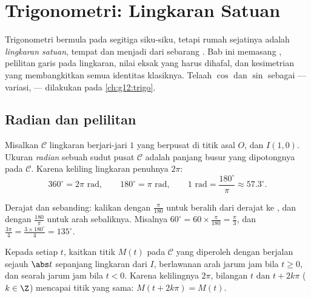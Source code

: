 \chapter{Trigonometri: Lingkaran Satuan}\label{ch:g11:trigo}

Trigonometri bermula pada segitiga siku-siku, tetapi rumah sejatinya adalah
\emph{lingkaran satuan}, tempat  dan  menjadi  dari sebarang
. Bab ini memasang , pelilitan garis
 pada lingkaran, nilai eksak yang harus dihafal, dan
kesimetrian yang membangkitkan semua identitas klasiknya. Telaah
$\cos$ dan $\sin$ sebagai  --- variasi,  --- dilakukan
pada \cref{ch:g12:trigo}.

\section{Radian dan pelilitan}

\begin{definition}[Radian]\label{def:g11:trigo:radian}
Misalkan $\mathcal C$ lingkaran berjari-jari $1$ yang berpusat di titik asal
$O$, dan $I(1, 0)$. Ukuran \emph{radian} sebuah sudut pusat
$\mathcal C$ adalah panjang busur yang dipotongnya pada $\mathcal C$.
Karena keliling lingkaran penuhnya $2\pi$:
\[
360^\circ = 2\pi \text{ rad},
\qquad
180^\circ = \pi \text{ rad},
\qquad
1 \text{ rad} = \frac{180^\circ}{\pi} \approx 57.3^\circ .
\]
\end{definition}

\begin{method}[Mengonversi]\label{met:g11:trigo:convert}
Derajat dan  sebanding: kalikan dengan $\frac{\pi}{180}$ untuk beralih
dari derajat ke , dan dengan $\frac{180}{\pi}$ untuk arah sebaliknya.
Misalnya $60^\circ = 60 \times \frac{\pi}{180} = \frac{\pi}{3}$, dan
$\frac{3\pi}{4} = \frac{3 \times 180^\circ}{4} = 135^\circ$.
\end{method}

\begin{definition}\label{def:g11:trigo:winding}
Kepada setiap  $t$, kaitkan titik $M(t)$ pada $\mathcal C$
yang diperoleh dengan berjalan sejauh $\abs t$ sepanjang lingkaran dari $I$,
berlawanan arah jarum jam bila $t \geq 0$, dan searah jarum jam bila $t < 0$. Karena
kelilingnya $2\pi$, bilangan $t$ dan $t + 2k\pi$ ($k \in \Z$)
mencapai titik yang sama: $M(t + 2k\pi) = M(t)$.
\end{definition}

